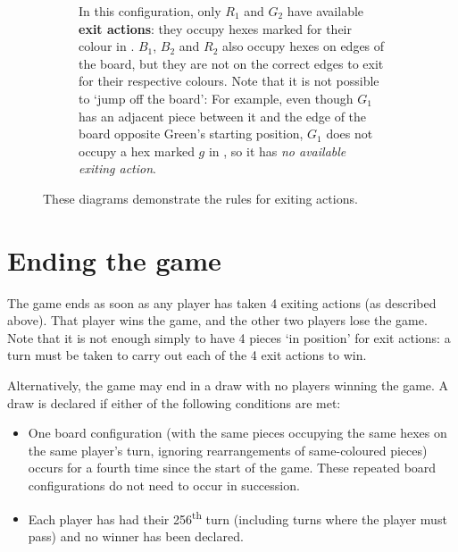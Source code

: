 \documentclass[]{article}
\begin{document}
\begin{figure}[ht!]
\begin{subfigure}{.62\textwidth}
\begin{tikzpicture}
    \end{tikzpicture}
    \caption{\label{fig:exit-eg}
        In this configuration, only $R_1$ and $G_2$ have available
        \textbf{exit actions}:
        they occupy hexes marked for their colour in .
        $B_1$, $B_2$ and $R_2$ also occupy hexes on edges of the board,
        but they are not on the correct edges to exit for their respective
        colours. Note that it is not possible to `jump off the board': For
        example, even though $G_1$ has an adjacent piece between it and the
        edge of the board opposite Green's starting position, $G_1$ does not
        occupy a hex marked $g$ in , so it has \emph{no
        available exiting action}.
    }
\end{subfigure}
\caption{\label{fig:exit}
    These diagrams demonstrate the rules for exiting actions.
}
\end{figure}

\section*{Ending the game}

The game ends as soon as any player has taken 4 exiting actions (as
described above). That player wins the game, and the other two players
lose the game. Note that it is not enough simply to have 4 pieces `in
position' for exit actions: a turn must be taken to carry out each of
the 4 exit actions to win.

Alternatively, the game may end in a draw with no players winning the
game. A draw is declared if either of the following conditions are met:

\begin{itemize}
    \item
        One board configuration (with the same pieces occupying the same
        hexes on the same player's turn, ignoring rearrangements of
        same-coloured pieces) occurs for a fourth time since the start of
        the game.
        These repeated board configurations do not need to occur in
        succession.
    \item
        Each player has had their 256\textsuperscript{th} turn (including
        turns where the player must pass) and no winner has been declared.
\end{itemize}
\end{document}
